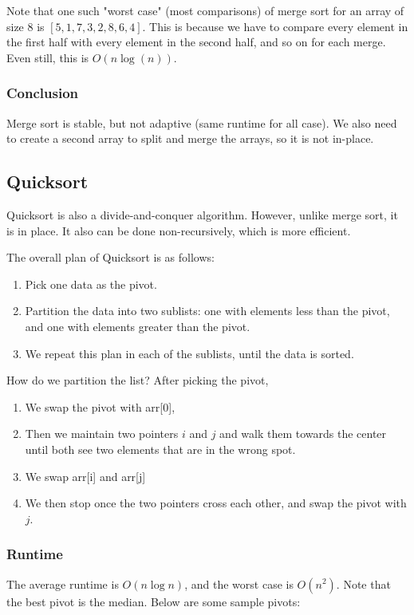 \documentclass[a4paper]{article}
\begin{document}
\begin{note}
	Note that one such "worst case" (most comparisons) of merge sort for an array of size 8 is \([5, 1, 7, 3, 2, 8, 6, 4]\). This is because we have to compare every element in the first half with every element in the second half, and so on for each merge. Even still, this is \( O(n\log (n)) \).
\end{note}

\subsubsection{Conclusion}
Merge sort is stable, but not adaptive (same runtime for all case). We also need to create a second array to split and merge the arrays, so it is not in-place.

\subsection{Quicksort}
Quicksort is also a divide-and-conquer algorithm. However, unlike merge sort, it is in place. It also can be done non-recursively, which is more efficient.

The overall plan of Quicksort is as follows:
\begin{enumerate}
	\item Pick one data as the pivot.
	\item Partition the data into two sublists: one with elements less than the pivot, and one with elements greater than the pivot.
	\item We repeat this plan in each of the sublists, until the data is sorted.
\end{enumerate}



How do we partition the list? After picking the pivot,
\begin{enumerate}
	\item We swap the pivot with arr[0],
	\item Then we maintain two pointers \( i \) and \( j \) and walk them towards the center until both see two elements that are in the wrong spot.
	\item We swap arr[i] and arr[j]
	\item We then stop once the two pointers cross each other, and swap the pivot with \( j \).
\end{enumerate}

\subsubsection{Runtime}
The average runtime is \( O(n \log n) \), and the worst case is \( O(n^2) \). Note that the best pivot is the median. Below are some sample pivots:
\end{document}
